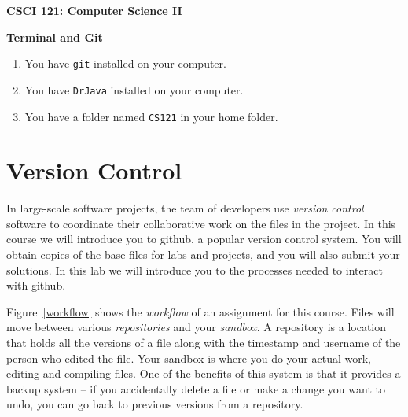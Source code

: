 \documentclass[11pt]{article}
\begin{document}
\centerline{\Large\bf CSCI 121: Computer Science II}

\vspace{.1in}

\centerline{\large\bf Terminal and Git}

\vspace{.25in}


\begin{enumerate}
\item You have {\tt git} installed on your computer.
\item You have {\tt DrJava} installed on your computer.
\item You have a folder named {\tt CS121} in your home folder.
\end{enumerate}


\section*{Version Control}

In large-scale software projects, the team of developers use {\em version control} software to coordinate their collaborative work on the files in the project.  In this course we will introduce you to github, a popular version control system.  You will obtain copies of the base files for labs and projects, and you will also submit your solutions.  In this lab we will introduce you to the processes needed to interact with github.

Figure~\ref{workflow} shows the {\em workflow} of an assignment for this course.  Files will move between various {\em repositories} and your {\em sandbox}.  A repository is a location that holds all the versions of a file along with the timestamp and username of the person who edited the file.  Your sandbox is where you do your actual work, editing and compiling files.  One of the benefits of this system is that it provides a backup system -- if you accidentally delete a file or make a change you want to undo, you can go back to previous versions from a repository.
\end{document}
